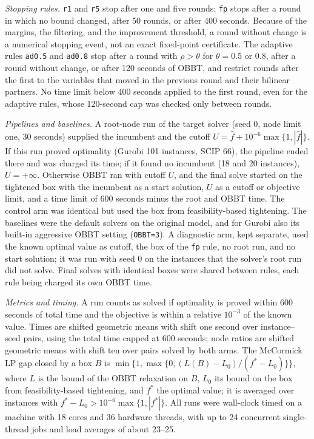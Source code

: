 \emph{Stopping rules.} \texttt{r1} and \texttt{r5} stop after one and five
rounds; \texttt{fp} stops after a round in which no bound changed, after 50
rounds, or after 400 seconds. Because of the margins, the filtering, and the
improvement threshold, a round without change is a numerical stopping event,
not an exact fixed-point certificate. The adaptive rules \texttt{ad0.5} and
\texttt{ad0.8} stop after a round with $\rho>\theta$ for $\theta=0.5$ or $0.8$, after a round without change, or
after 120 seconds of OBBT, and restrict rounds after the first to the variables
that moved in the previous round and their bilinear partners. No time limit
below 400 seconds applied to the first round, even for the adaptive rules, whose
120-second cap was checked only between rounds.

\emph{Pipelines and baselines.} A root-node run of the target solver (seed $0$,
node limit one, 30 seconds) supplied the incumbent and the cutoff
$U=\hat f+10^{-6}\max\{1,|\hat f|\}$. If this run proved optimality (Gurobi
101 instances, SCIP 66), the pipeline ended there and was charged its time; if
it found no incumbent (18 and 20 instances), $U=+\infty$. Otherwise OBBT ran with
cutoff $U$, and the final solve started on the tightened box with the incumbent
as a start solution, $U$ as a cutoff or objective limit, and a time limit of
600 seconds minus the root and OBBT time. The control arm was identical but used
the box from feasibility-based tightening. The baselines were the default
solvers on the original model, and for Gurobi also its built-in aggressive OBBT
setting (\texttt{OBBT=3}). A diagnostic arm, kept separate, used the known
optimal value as cutoff, the box of the \texttt{fp} rule, no root run, and no
start solution;
it was run with seed $0$ on the instances that the solver's root run did not
solve. Final solves with identical boxes were shared between rules, each rule
being charged its own OBBT time.

\emph{Metrics and timing.} A run counts as solved if optimality is proved within
600 seconds of total time and the objective is within a relative $10^{-3}$ of the
known value. Times are shifted geometric means with shift one second over
instance--seed pairs, using the total time capped at 600 seconds; node ratios are
shifted geometric means with shift ten over pairs solved by both arms. The
McCormick LP gap closed by a box $B$ is
$\min\{1,\max\{0,(L(B)-L_0)/(f^*-L_0)\}\}$, where $L$ is the bound of the OBBT
relaxation on $B$, $L_0$ its bound on the box from feasibility-based tightening,
and $f^*$ the optimal value; it is averaged over instances with
$f^*-L_0>10^{-6}\max\{1,|f^*|\}$. All runs were wall-clock timed on a machine with
18 cores and 36 hardware threads, with up to 24 concurrent single-thread jobs and
load averages of about 23--25.

